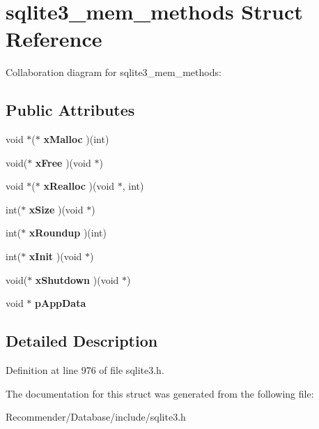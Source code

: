 \section{sqlite3\_\-mem\_\-methods Struct Reference}
\label{structsqlite3__mem__methods}
Collaboration diagram for sqlite3\_\-mem\_\-methods:\subsection*{Public Attributes}
\begin{CompactItemize}
\item 
void $\ast$($\ast$ \textbf{xMalloc} )(int)\label{structsqlite3__mem__methods_41942c9c5a9b4e13ef3cac6fee8f59eb}

\item 
void($\ast$ \textbf{xFree} )(void $\ast$)\label{structsqlite3__mem__methods_91abab31fe16927c08291ab9b332bf8f}

\item 
void $\ast$($\ast$ \textbf{xRealloc} )(void $\ast$, int)\label{structsqlite3__mem__methods_f9eda04d7d0deda6286d56fc738513d0}

\item 
int($\ast$ \textbf{xSize} )(void $\ast$)\label{structsqlite3__mem__methods_37f680cda62590be32b36d962b6ce009}

\item 
int($\ast$ \textbf{xRoundup} )(int)\label{structsqlite3__mem__methods_02b48fb7c072d77a055859d16cd94077}

\item 
int($\ast$ \textbf{xInit} )(void $\ast$)\label{structsqlite3__mem__methods_707c4748dcafc75384a806d13bb68bdd}

\item 
void($\ast$ \textbf{xShutdown} )(void $\ast$)\label{structsqlite3__mem__methods_34a88425495f42099aadbe3fa9676a06}

\item 
void $\ast$ {\bf pAppData}\label{structsqlite3__mem__methods_1e6eda095a5b3e9fc4d6c3d88236a844}

\end{CompactItemize}


\subsection{Detailed Description}




Definition at line 976 of file sqlite3.h.

The documentation for this struct was generated from the following file:\begin{CompactItemize}
\item 
Recommender/Database/include/sqlite3.h\end{CompactItemize}
